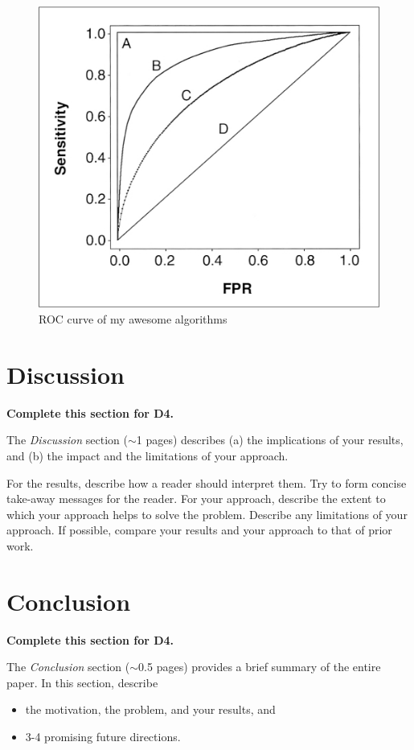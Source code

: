 \documentclass[letterpaper]{article} %
\begin{document}
\begin{figure}[htbp!]
  \centering
  \includegraphics[width=0.9\linewidth]{figures/roc.png}
  \caption{ROC curve of my awesome algorithms}
  \label{fig:results2}
\end{figure}



\section{Discussion}

{\bf Complete this section for D4.}

The {\it Discussion} section ($\sim$1 pages) describes (a) the implications of your results, and (b) the impact and the limitations of your approach.  

For the results, describe how a reader should interpret them.  Try to form concise take-away messages for the reader.  For your approach, describe the extent to which your approach helps to solve the problem.  Describe any limitations of your approach.  If possible, compare your results and your approach to that of prior work. 


\section{Conclusion}

{\bf Complete this section for D4.}

The {\it Conclusion} section ($\sim$0.5 pages) provides a brief summary of the entire paper.  In this section, describe 
\begin{itemize}
    \item the motivation, the problem, and your results, and
    \item 3-4 promising future directions.
\end{itemize}

\newpage


\end{document}

